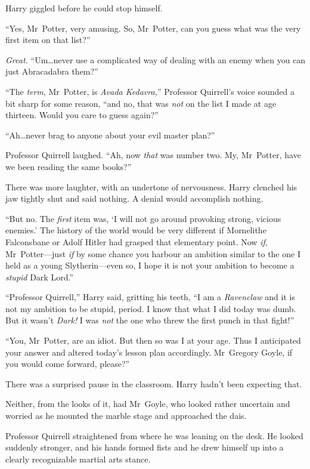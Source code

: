 Harry giggled before he could stop himself.

“Yes, Mr~Potter, very amusing. So, Mr~Potter, can you guess what was the very first item on that list?”

\emph{Great.} “Um…never use a complicated way of dealing with an enemy when you can just Abracadabra them?”

“The \emph{term}, Mr~Potter, is \emph{Avada Kedavra,}” Professor Quirrell’s voice sounded a bit sharp for some reason, “and no, that was \emph{not} on the list I made at age thirteen. Would you care to guess again?”

“Ah…never brag to anyone about your evil master plan?”

Professor Quirrell laughed. “Ah, now \emph{that} was number two. My, Mr~Potter, have we been reading the same books?”

There was more laughter, with an undertone of nervousness. Harry clenched his jaw tightly shut and said nothing. A denial would accomplish nothing.

“But no. The \emph{first} item was, ‘I will not go around provoking strong, vicious enemies.’ The history of the world would be very different if Mornelithe Falconsbane or Adolf Hitler had grasped that elementary point. Now \emph{if}, Mr~Potter—just \emph{if} by some chance you harbour an ambition similar to the one I held as a young Slytherin—even so, I hope it is not your ambition to become a \emph{stupid} Dark Lord.”

“Professor Quirrell,” Harry said, gritting his teeth, “I am a \emph{Ravenclaw} and it is not my ambition to be stupid, period. I know that what I did today was dumb. But it wasn’t \emph{Dark!} I was \emph{not} the one who threw the first punch in that fight!”

“You, Mr~Potter, are an idiot. But then so was I at your age. Thus I anticipated your answer and altered today’s lesson plan accordingly. Mr~Gregory Goyle, if you would come forward, please?”

There was a surprised pause in the classroom. Harry hadn’t been expecting that.

Neither, from the looks of it, had Mr~Goyle, who looked rather uncertain and worried as he mounted the marble stage and approached the dais.

Professor Quirrell straightened from where he was leaning on the desk. He looked suddenly stronger, and his hands formed fists and he drew himself up into a clearly recognizable martial arts stance.

